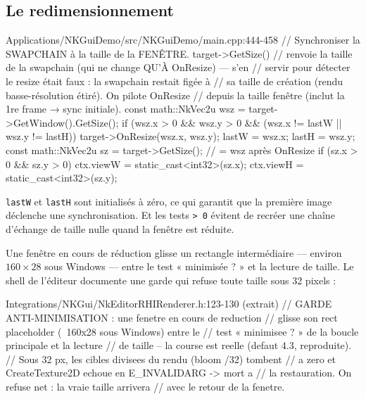 \subsection{Le redimensionnement}

\begin{nkcode}{Applications/NKGuiDemo/src/NKGuiDemo/main.cpp:444-458}
        // Synchroniser la SWAPCHAIN à la taille de la FENÊTRE. target->GetSize()
        // renvoie la taille de la swapchain (qui ne change QU'À OnResize) — s'en
        // servir pour détecter le resize était faux : la swapchain restait figée à
        // sa taille de création (rendu basse-résolution étiré). On pilote OnResize
        // depuis la taille fenêtre (inclut la 1re frame → sync initiale).
        const math::NkVec2u wsz = target->GetWindow().GetSize();
        if (wsz.x > 0 && wsz.y > 0 && (wsz.x != lastW || wsz.y != lastH)) {
            target->OnResize(wsz.x, wsz.y);
            lastW = wsz.x;
            lastH = wsz.y;
        }
        const math::NkVec2u sz = target->GetSize(); // = wsz après OnResize
        if (sz.x > 0 && sz.y > 0) {
            ctx.viewW = static_cast<int32>(sz.x);
            ctx.viewH = static_cast<int32>(sz.y);
        }
\end{nkcode}

\texttt{lastW} et \texttt{lastH} sont initialisés à zéro, ce qui garantit que la
première image déclenche une synchronisation. Et les tests \texttt{> 0} évitent
de recréer une chaîne d'échange de taille nulle quand la fenêtre est réduite.

\begin{nkpiege}
Une fenêtre en cours de réduction glisse un rectangle intermédiaire — environ
$160 \times 28$ sous Windows — entre le test « minimisée ? » et la lecture de
taille. Le shell de l'éditeur documente une garde qui refuse toute taille sous
32 pixels :

\begin{nkcode}{Integrations/NKGui/NkEditorRHIRenderer.h:123-130 (extrait)}
// GARDE ANTI-MINIMISATION : une fenetre en cours de reduction
// glisse son rect placeholder (~160x28 sous Windows) entre le
// test « minimisee ? » de la boucle principale et la lecture
// de taille -- la course est reelle (defaut 4.3, reproduite).
// Sous 32 px, les cibles divisees du rendu (bloom /32) tombent
// a zero et CreateTexture2D echoue en E_INVALIDARG -> mort a
// la restauration. On refuse net : la vraie taille arrivera
// avec le retour de la fenetre.
\end{nkcode}
\end{nkpiege}

